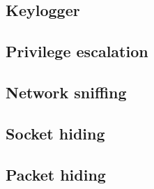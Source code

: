 \documentclass{article}
\begin{document}
\subsection{Keylogger}
\subsection{Privilege escalation}
\subsection{Network sniffing}
\subsection{Socket hiding}
\subsection{Packet hiding}
~\cite{Test}

{}

\end{document}
